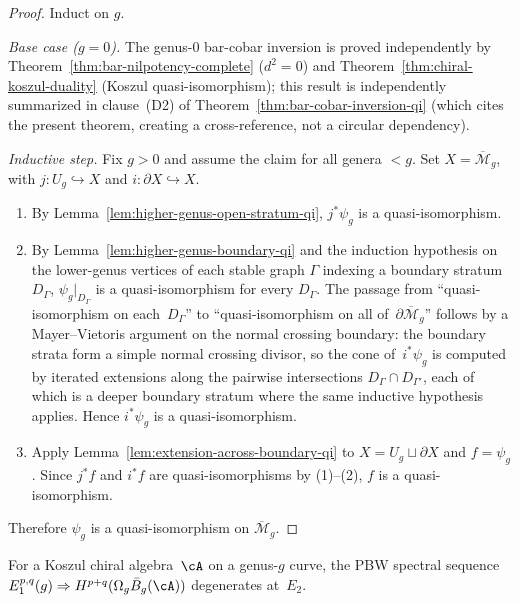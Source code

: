 \begin{proof}
Induct on $g$.

\emph{Base case ($g=0$).}
The genus-$0$ bar-cobar inversion is proved independently by
Theorem~\ref{thm:bar-nilpotency-complete} ($d^2 = 0$) and
Theorem~\ref{thm:chiral-koszul-duality} (Koszul quasi-isomorphism);
this result is independently summarized in clause~(D2) of Theorem~\ref{thm:bar-cobar-inversion-qi} (which cites the present theorem, creating a cross-reference, not a circular dependency).

\emph{Inductive step.}
Fix $g>0$ and assume the claim for all genera $<g$. Set
$X=\overline{\mathcal{M}}_g$, with $j:U_g\hookrightarrow X$ and
$i:\partial X\hookrightarrow X$.
\begin{enumerate}[label=(\arabic*)]
\item By Lemma~\ref{lem:higher-genus-open-stratum-qi}, $j^*\psi_g$ is a
quasi-isomorphism.
\item By Lemma~\ref{lem:higher-genus-boundary-qi} and the induction hypothesis
on the lower-genus vertices of each stable graph $\Gamma$ indexing a boundary
stratum $D_\Gamma$, $\psi_g|_{D_\Gamma}$ is a quasi-isomorphism for every
$D_\Gamma$. The passage from ``quasi-isomorphism on each~$D_\Gamma$''
to ``quasi-isomorphism on all of~$\partial\overline{\mathcal{M}}_g$''
follows by a Mayer--Vietoris argument on the normal crossing boundary:
the boundary strata form a simple normal crossing divisor, so the
cone of~$i^*\psi_g$ is computed by iterated extensions along the
pairwise intersections $D_\Gamma \cap D_{\Gamma'}$, each of which
is a deeper boundary stratum where the same inductive hypothesis
applies.  Hence $i^*\psi_g$ is a quasi-isomorphism.
\item Apply Lemma~\ref{lem:extension-across-boundary-qi} to
$X=U_g\sqcup\partial X$ and $f=\psi_g$. Since $j^*f$ and $i^*f$ are
quasi-isomorphisms by (1)--(2), $f$ is a quasi-isomorphism.
\end{enumerate}
Therefore $\psi_g$ is a quasi-isomorphism on $\overline{\mathcal{M}}_g$.
\end{proof}

\begin{lemma}\label{lem:e2-collapse-higher-genus}
For a Koszul chiral algebra~$\cA$ on a genus-$g$ curve, the PBW
spectral sequence
$E_1^{p,q}(g) \Rightarrow H^{p+q}(\Omega_g \bar{B}_g(\cA))$
degenerates at~$E_2$.
\end{lemma}

